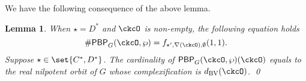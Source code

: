 \documentclass[12pt,a4paper]{amsart}
\newcommand{\trivial}[2][]{\if\relax\detokenize{#1}\relax
  {%
      \color{orange} \vspace{0em} $[$  #2 $]$
      \color{black}
  }
  \else
\ifx#1h
\ifcsname showtrivial\endcsname
{%
    \color{orange} \vspace{0em}  $[$ #2 $]$
    \color{black}
}
\fi
\else {\red Wrong argument!} \fi
\fi
}
\def\subset{\subseteq}
\def\DD{\nabla}
\numberwithin{equation}{section}
\newtheorem{lem}[thm]{Lemma}
\newtheorem{prop}[thm]{Proposition}
\theoremstyle{remark}
\def\half{{\tfrac{1}{2}}}
\def\dBV{d_{\mathrm{BV}}}
\def\DD{\nabla}
\def\CPPs{\mathrm{PP}_{\star}}
\def\PBP{\mathsf{PBP}}
\def\ckcOg{\ckcO_{\mathrm g}}
\def\PBPop#1#2#3#4{\PBP_{#1}^{#2}(#3,#4)}
\def\PBPGOP{\PBPop{G}{}{\ckcO}{\wp}}
\def\DD{\nabla}
\begin{document}
We have the following consequence of the above lemma.

\begin{lem}\label{lem:gf.C*}
  When $\star = D^{*}$ and $\ckcO$ is non-empty,
  the following equation holds
  \[
    \# \PBPGOP = f_{\star',\DD(\ckcO),\emptyset}(1,1).
  \]
  Suppose $\star\in \set{C^{*}, D^{*}}$. The cardinality of  $\PBPGOP(\ckcO)$ equals
  to the real nilpotent orbit of $G$ whose complexification is $\dBV(\ckcO)$.
  \qed
\end{lem}






\end{document}
